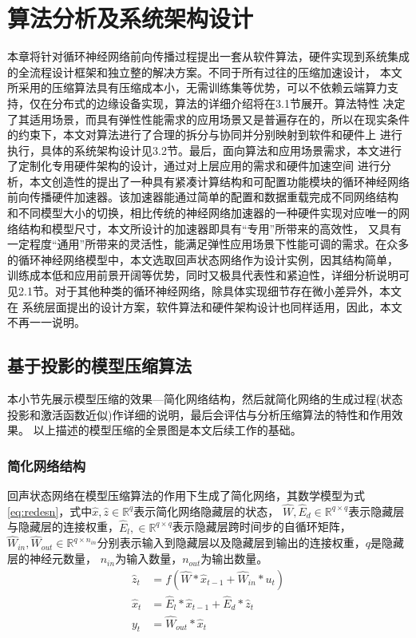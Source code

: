 \chapter{算法分析及系统架构设计}
本章将针对循环神经网络前向传播过程提出一套从软件算法，硬件实现到系统集成的全流程设计框架和独立整的解决方案。不同于所有过往的压缩加速设计，
本文所采用的压缩算法具有压缩成本小，无需训练集等优势，可以不依赖云端算力支持，仅在分布式的边缘设备实现，算法的详细介绍将在3.1节展开。算法特性
决定了其适用场景，而具有弹性性能需求的应用场景又是普遍存在的，所以在现实条件的约束下，本文对算法进行了合理的拆分与协同并分别映射到软件和硬件上
进行执行，具体的系统架构设计见3.2节。最后，面向算法和应用场景需求，本文进行了定制化专用硬件架构的设计，通过对上层应用的需求和硬件加速空间
进行分析，本文创造性的提出了一种具有紧凑计算结构和可配置功能模块的循环神经网络前向传播硬件加速器。该加速器能通过简单的配置和数据重载完成不同网络结构
和不同模型大小的切换，相比传统的神经网络加速器的一种硬件实现对应唯一的网络结构和模型尺寸，本文所设计的加速器即具有“专用”所带来的高效性，
又具有一定程度“通用”所带来的灵活性，能满足弹性应用场景下性能可调的需求。在众多的循环神经网络模型中，本文选取回声状态网络作为设计实例，因其结构简单，
训练成本低和应用前景开阔等优势，同时又极具代表性和紧迫性，详细分析说明可见2.1节。对于其他种类的循环神经网络，除具体实现细节存在微小差异外，本文在
系统层面提出的设计方案，软件算法和硬件架构设计也同样适用，因此，本文不再一一说明。
\section{基于投影的模型压缩算法}
本小节先展示模型压缩的效果---简化网络结构，然后就简化网络的生成过程(状态投影和激活函数近似)作详细的说明，最后会评估与分析压缩算法的特性和作用效果。
以上描述的模型压缩的全景图是本文后续工作的基础。
\subsection{简化网络结构}
回声状态网络在模型压缩算法的作用下生成了简化网络，其数学模型为式\ref{eq:redesn}，式中\(\widehat{x},\widehat{z} \in \mathbb{R}^q\)表示简化网络隐藏层的状态，
\(\widehat{W}, \widehat{E}_d \in \mathbb{R}^{q \times q}\)表示隐藏层与隐藏层的连接权重，\(\widehat{E}_l,\in \mathbb{R}^{q \times q}\)表示隐藏层跨时间步的自循环矩阵，
\(\widehat{W}_{in},\widehat{W}_{out}\in \mathbb{R}^{q \times n_{in}}\)分别表示输入到隐藏层以及隐藏层到输出的连接权重，\(q\)是隐藏层的神经元数量，
\(n_{in}\)为输入数量，\(n_{out}\)为输出数量。
\begin{equation}\label{eq:redesn}
	\begin{split}
		\widehat{z}_t &= f(\widehat{W} * \widehat{x}_{t-1} + \widehat{W}_{in} * u_{t})				\\	
		\widehat{x}_t &= \widehat{E}_l * \widehat{x}_{t-1} + \widehat{E}_d * \widehat{z}_{t} 		\\
		y_{t} 			&= \widehat{W}_{out} * \widehat{x}_{t}	
	\end{split}
\end{equation}

